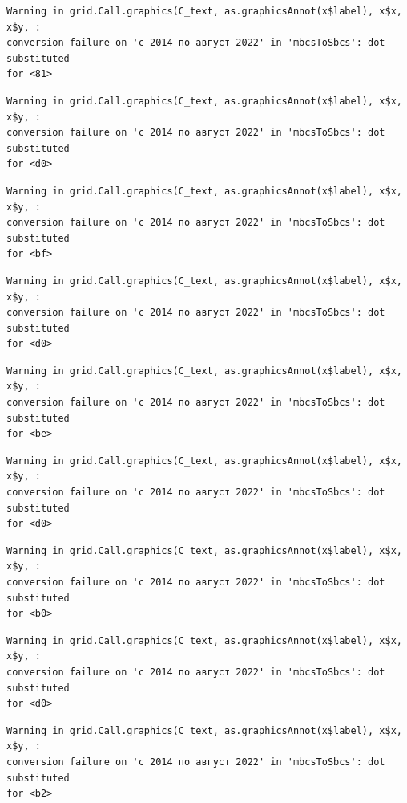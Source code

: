 \documentclass[
  letterpaper,
  DIV=11,
  numbers=noendperiod]{scrartcl}
\begin{document}
\begin{verbatim}
Warning in grid.Call.graphics(C_text, as.graphicsAnnot(x$label), x$x, x$y, :
conversion failure on 'с 2014 по август 2022' in 'mbcsToSbcs': dot substituted
for <81>
\end{verbatim}

\begin{verbatim}
Warning in grid.Call.graphics(C_text, as.graphicsAnnot(x$label), x$x, x$y, :
conversion failure on 'с 2014 по август 2022' in 'mbcsToSbcs': dot substituted
for <d0>
\end{verbatim}

\begin{verbatim}
Warning in grid.Call.graphics(C_text, as.graphicsAnnot(x$label), x$x, x$y, :
conversion failure on 'с 2014 по август 2022' in 'mbcsToSbcs': dot substituted
for <bf>
\end{verbatim}

\begin{verbatim}
Warning in grid.Call.graphics(C_text, as.graphicsAnnot(x$label), x$x, x$y, :
conversion failure on 'с 2014 по август 2022' in 'mbcsToSbcs': dot substituted
for <d0>
\end{verbatim}

\begin{verbatim}
Warning in grid.Call.graphics(C_text, as.graphicsAnnot(x$label), x$x, x$y, :
conversion failure on 'с 2014 по август 2022' in 'mbcsToSbcs': dot substituted
for <be>
\end{verbatim}

\begin{verbatim}
Warning in grid.Call.graphics(C_text, as.graphicsAnnot(x$label), x$x, x$y, :
conversion failure on 'с 2014 по август 2022' in 'mbcsToSbcs': dot substituted
for <d0>
\end{verbatim}

\begin{verbatim}
Warning in grid.Call.graphics(C_text, as.graphicsAnnot(x$label), x$x, x$y, :
conversion failure on 'с 2014 по август 2022' in 'mbcsToSbcs': dot substituted
for <b0>
\end{verbatim}

\begin{verbatim}
Warning in grid.Call.graphics(C_text, as.graphicsAnnot(x$label), x$x, x$y, :
conversion failure on 'с 2014 по август 2022' in 'mbcsToSbcs': dot substituted
for <d0>
\end{verbatim}

\begin{verbatim}
Warning in grid.Call.graphics(C_text, as.graphicsAnnot(x$label), x$x, x$y, :
conversion failure on 'с 2014 по август 2022' in 'mbcsToSbcs': dot substituted
for <b2>
\end{verbatim}
\end{document}
